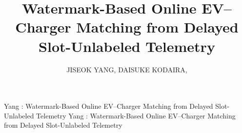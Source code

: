 \documentclass{ieeeaccess}
\newif\ifhighlight \highlightfalse
\DeclareRobustCommand{\revised}[1]{\ifhighlight{\color{blue}#1}\else{\color{.}#1}\fi}
\begin{document}

    \title{\revised{Watermark-Based Online EV--Charger Matching from Delayed Slot-Unlabeled Telemetry}}

    \author{\uppercase{Jiseok Yang},
        \uppercase{Daisuke Kodaira}, }

    \address[1]{Degree Programs in Systems and Information Engineering, Graduate School of Science and Technology, University of Tsukuba, Tsukuba 305-8573, Japan}
    \address[2]{Institute of Systems and Information Engineering, University of Tsukuba, Tsukuba 305-8573, Japan}


    \markboth
    {Yang \headeretal: Watermark-Based Online EV--Charger Matching from Delayed Slot-Unlabeled Telemetry}
    {Yang \headeretal: Watermark-Based Online EV--Charger Matching from Delayed Slot-Unlabeled Telemetry}

\end{document}

